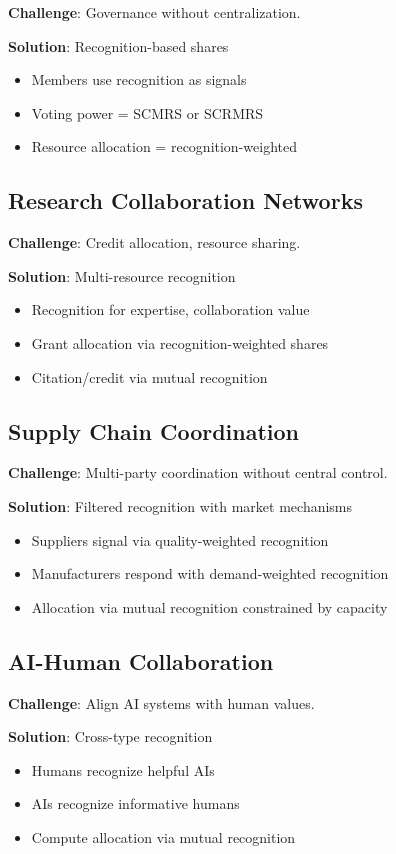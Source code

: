 \documentclass[11pt,a4paper]{article}
\theoremstyle{definition}
\theoremstyle{remark}
\begin{document}
\textbf{Challenge}: Governance without centralization.

\textbf{Solution}: Recognition-based shares
\begin{itemize}
\item Members use recognition as signals
\item Voting power = SCMRS or SCRMRS
\item Resource allocation = recognition-weighted
\end{itemize}

\subsection{Research Collaboration Networks}

\textbf{Challenge}: Credit allocation, resource sharing.

\textbf{Solution}: Multi-resource recognition
\begin{itemize}
\item Recognition for expertise, collaboration value
\item Grant allocation via recognition-weighted shares
\item Citation/credit via mutual recognition
\end{itemize}

\subsection{Supply Chain Coordination}

\textbf{Challenge}: Multi-party coordination without central control.

\textbf{Solution}: Filtered recognition with market mechanisms
\begin{itemize}
\item Suppliers signal via quality-weighted recognition
\item Manufacturers respond with demand-weighted recognition
\item Allocation via mutual recognition constrained by capacity
\end{itemize}

\subsection{AI-Human Collaboration}

\textbf{Challenge}: Align AI systems with human values.

\textbf{Solution}: Cross-type recognition
\begin{itemize}
\item Humans recognize helpful AIs
\item AIs recognize informative humans
\item Compute allocation via mutual recognition
\end{itemize}
\end{document}
